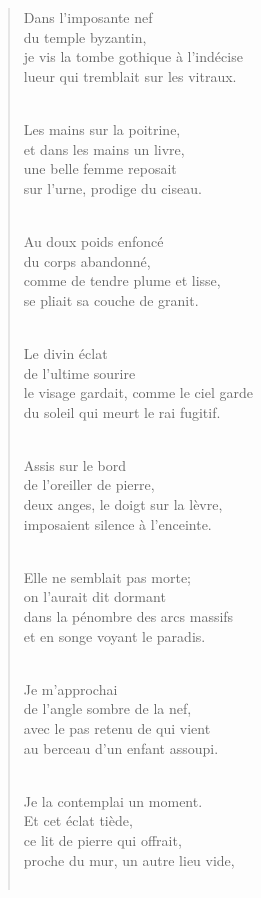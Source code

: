\documentclass[a4paper,12pt]{book}
\begin{document}
\begin{verse}
Dans l'imposante nef \\
du temple byzantin, \\
je vis la tombe gothique à l'indécise \\
lueur qui tremblait sur les vitraux. \\ \

Les mains sur la poitrine, \\
et dans les mains un livre, \\
une belle femme reposait \\
sur l'urne, prodige du ciseau. \\ \

Au doux poids enfoncé \\
du corps abandonné, \\
comme de tendre plume et lisse, \\
se pliait sa couche de granit. \\ \

Le divin éclat \\
de l'ultime sourire \\
le visage gardait, comme le ciel garde \\
du soleil qui meurt le rai fugitif. \\ \

Assis sur le bord \\
de l'oreiller de pierre, \\
deux anges, le doigt sur la lèvre, \\
imposaient silence à l'enceinte. \\ \

Elle ne semblait pas morte; \\
on l'aurait dit dormant \\
dans la pénombre des arcs massifs \\
et en songe voyant le paradis. \\ \

Je m'approchai \\
de l'angle sombre de la nef, \\
avec le pas retenu de qui vient \\
au berceau d'un enfant assoupi. \\ \

Je la contemplai un moment. \\
Et cet éclat tiède, \\
ce lit de pierre qui offrait, \\
proche du mur, un autre lieu vide, \\ \


\end{verse}
\end{document}
